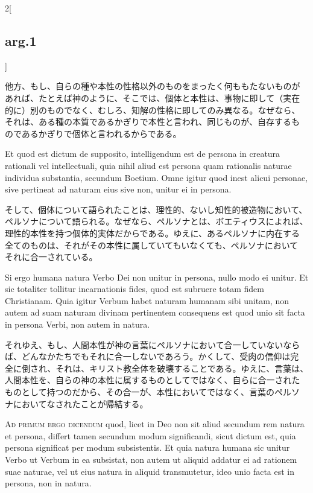 \documentclass[paper=a4paper,fontsize=10pt,jafontsize=9pt,titlepage]{jlreq}
\begin{document}
\begin{paracol}{2}[\subsection{arg.1}]
\switchcolumn

他方、もし、自らの種や本性の性格以外のものをまったく何ももたないものが
あれば、たとえば神のように、そこでは、個体と本性は、事物に即して（実在
的に）別のものでなく、むしろ、知解の性格に即してのみ異なる。なぜなら、
それは、ある種の本質であるかぎりで本性と言われ、同じものが、自存するも
のであるかぎりで個体と言われるからである。

\switchcolumn*

Et quod est dictum de supposito, intelligendum est de persona in
creatura rationali vel intellectuali, quia nihil aliud est persona
quam rationalis naturae individua substantia, secundum Boetium.  Omne
igitur quod inest alicui personae, sive pertineat ad naturam eius sive
non, unitur ei in persona.

\switchcolumn

そして、個体について語られたことは、理性的、ないし知性的被造物において、
ペルソナについて語られる。なぜなら、ペルソナとは、ボエティウスによれば、
理性的本性を持つ個体的実体だからである。ゆえに、あるペルソナに内在する
全てのものは、それがその本性に属していてもいなくても、ペルソナにおいて
それに合一されている。

\switchcolumn*

Si ergo humana natura Verbo Dei non unitur in persona, nullo modo ei
unitur.  Et sic totaliter tollitur incarnationis fides, quod est
subruere totam fidem Christianam. Quia igitur Verbum habet naturam
humanam sibi unitam, non autem ad suam naturam divinam pertinentem
consequens est quod unio sit facta in persona Verbi, non autem in
natura.

\switchcolumn

それゆえ、もし、人間本性が神の言葉にペルソナにおいて合一していないなら
ば、どんなかたちでもそれに合一しないであろう。かくして、受肉の信仰は完
全に倒され、それは、キリスト教全体を破壊することである。ゆえに、言葉は、
人間本性を、自らの神の本性に属するものとしてではなく、自らに合一された
ものとして持つのだから、その合一が、本性においてではなく、言葉のペルソ
ナにおいてなされたことが帰結する。

\switchcolumn*[\subsection{ad.1}]

{\scshape Ad primum ergo dicendum} quod, licet in Deo non sit aliud
secundum rem natura et persona, differt tamen secundum modum
significandi, sicut dictum est, quia persona significat per modum
subsistentis. Et quia natura humana sic unitur Verbo ut Verbum in ea
subsistat, non autem ut aliquid addatur ei ad rationem suae naturae,
vel ut eius natura in aliquid transmutetur, ideo unio facta est in
persona, non in natura.


\end{paracol}
\end{document}
